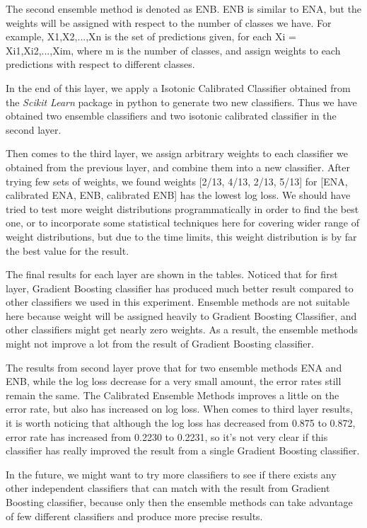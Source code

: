 \documentclass{sig-alternate-05-2015}
\begin{document}
The second ensemble method is denoted as ENB. ENB is similar to ENA, but the weights will be assigned with respect to the number of classes we have. For example, X1,X2,...,Xn is the set of predictions given, for each Xi = Xi1,Xi2,...,Xim, where m is the number of classes, and assign weights to each predictions with respect to different classes.

In the end of this layer, we apply a Isotonic Calibrated Classifier obtained from the \emph{Scikit Learn} package in python to generate two new classifiers. Thus we have obtained two ensemble classifiers and two isotonic calibrated classifier in the second layer.

Then comes to the third layer, we assign arbitrary weights to each classifier we obtained from the previous layer, and combine them into a new classifier. After trying few sets of weights, we found weights [2/13, 4/13, 2/13, 5/13] for [ENA, calibrated ENA, ENB, calibrated ENB] has the lowest log loss. We should have tried to test more weight distributions programmatically in order to find the best one, or to incorporate some statistical techniques here for covering wider range of weight distributions, but due to the time limits, this weight distribution is by far the best value for the result.

The final results for each layer are shown in the tables. Noticed that for first layer, Gradient Boosting classifier has produced much better result compared to other classifiers we used in this experiment. Ensemble methods are not suitable here because weight will be assigned heavily to Gradient Boosting Classifier, and other classifiers might get nearly zero weights. As a result, the ensemble methods might not improve a lot from the result of Gradient Boosting classifier. 

The results from second layer prove that for two ensemble methods ENA and ENB, while the log loss decrease for a very small amount, the error rates still remain the same. The Calibrated Ensemble Methods improves a little on the error rate, but also has increased on log loss. When comes to third layer results, it is worth noticing that although the log loss has decreased from 0.875 to 0.872, error rate has increased from 0.2230 to 0.2231, so it's not very clear if this classifier has really improved the result from a single Gradient Boosting classifier.

In the future, we might want to try more classifiers to see if there exists any other independent classifiers that can match with the result from Gradient Boosting classifier, because only then the ensemble methods can take advantage of few different classifiers and produce more precise results.
\end{document}

